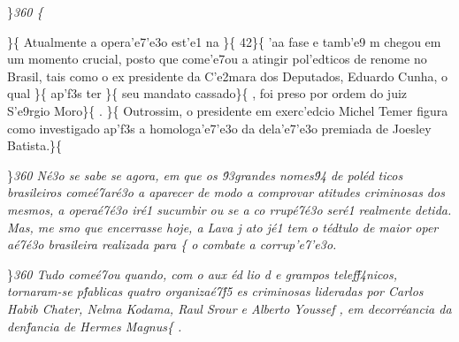 \}\pard \ltrpar\qj {}\sl360\widctlpar\wrapdefault\faauto{} \{\rtlch{}
 \ltrch{}  \par \}\{\rtlch{}  \ltrch{}
 Atualmente a opera'e7'e3o est'e1 na
\}\{\rtlch{}  \ltrch{}  42\}\{\rtlch{} 
\ltrch{}  'aa fase e tamb'e9 m chegou
em um momento crucial, posto que come'e7ou a atingir pol'edticos de
renome no Brasil, tais como o ex presidente da C'e2mara dos Deputados,
Eduardo Cunha, o qual \}\{\rtlch{}  \ltrch{} 
ap'f3s ter \}\{\rtlch{}  \ltrch{}
 seu mandato cassado\}\{\rtlch{} 
\ltrch{}  , foi preso por ordem do juiz S'e9rgio
Moro\}\{\rtlch{}  \ltrch{}  .
\}\{\rtlch{}  \ltrch{}  Outrossim, o presidente
em exerc'edcio Michel Temer figura como investigado ap'f3s a
homologa'e7'e3o da dela'e7'e3o premiada de Joesley
Batista.\}\{\rtlch{}  \ltrch{} 
\par \}\pard \ltrpar\qj {}\sl360\widctlpar\wrapdefault\faauto{} {\rtlch{}  \ltrch{}  N\'e3o se sabe se agora, em que os \'93grandes nomes\'94 de pol\'ed
ticos brasileiros come\'e7ar\'e3o a aparecer de modo a comprovar atitudes criminosas dos mesmos, a opera\'e7\'e3o ir\'e1 sucumbir ou se a co}{\rtlch{}  \ltrch{}  rrup\'e7\'e3o ser\'e1 realmente detida. }{\rtlch{}  
\ltrch{}  Mas, me}{\rtlch{}  \ltrch{}  smo que encerrasse hoje, a Lava}{\rtlch{}  \ltrch{}  j}{\rtlch{}  \ltrch{}  ato j\'e1
 tem o t\'edtulo de maior oper}{\rtlch{}  \ltrch{}  a\'e7\'e3o brasileira realizada para }\{\rtlch{}
 \ltrch{}  o combate a
corrup'e7'e3o.
\par \}\pard \ltrpar\qj {}\sl360\widctlpar\wrapdefault\faauto{} {\rtlch{}  \ltrch{}  Tudo come\'e7ou quando, com o aux}{\rtlch{}  \ltrch{}  \'ed
}{\rtlch{}  \ltrch{}  lio d}{\rtlch{}  \ltrch{}  e}{\rtlch{}  \ltrch{}   grampos telef\'f4nicos, tornaram-se p\'fablicas quatro organiza\'e7\'f5
es criminosas lideradas por Carlos Habib Chater, Nelma Kodama, Raul Srour e Alberto Youssef}{\rtlch{}  \ltrch{}  , em decorr\'eancia da den\'fancia de Hermes Magnus}\{\rtlch{}
 \ltrch{}  .

